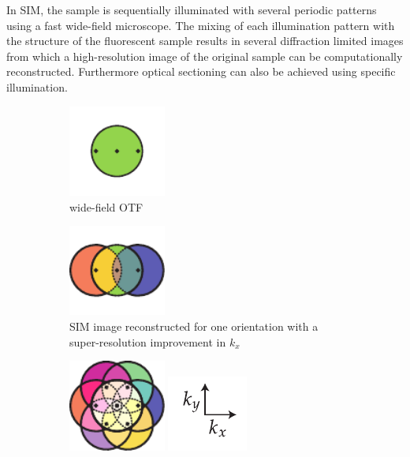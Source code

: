 In \gls{SIM}, the sample is sequentially illuminated with several periodic patterns using a fast \gls{wide-field} microscope.
The mixing of each illumination pattern with the structure of the fluorescent sample results in several diffraction limited images from which a high-resolution image of the original sample can be computationally reconstructed.
Furthermore optical sectioning can also be achieved using specific illumination.

\begin{figure}
    \centering
    \begin{subfigure}[t]{0.25\textwidth}
        \centering
        \includegraphics[height=3cm]{./sim/otf}
        \caption{\Gls{wide-field} \gls{OTF}}\label{fig:sim_otf}
    \end{subfigure}\hfill
    \begin{subfigure}[t]{0.25\textwidth}
        \centering
        \includegraphics[height=3cm]{./sim/third_flower}
        \caption{\gls{SIM} image reconstructed for one orientation with a \gls{super-resolution} improvement in \(k_x \)}\label{fig:sim_third_flower}
    \end{subfigure}\hfill
    \begin{subfigure}[t]{0.35\textwidth}
        \centering
        \includegraphics[height=3cm]{./sim/full_flower_alt}
        \includegraphics{./sim/xy_coordinates}%

\end{subfigure}
\end{figure}
